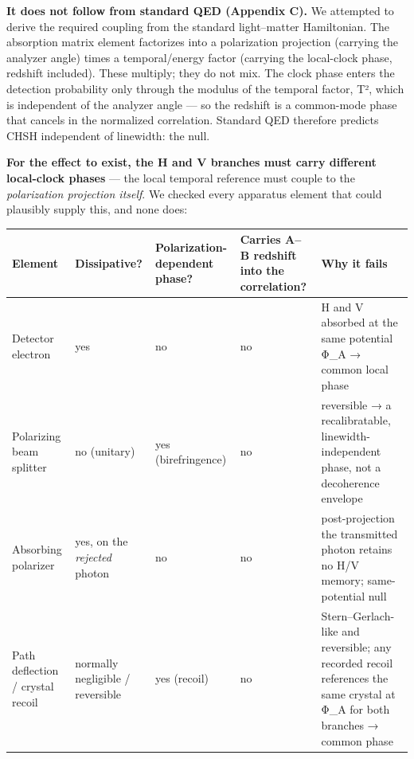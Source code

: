 \documentclass[
]{article}
\newcounter{none} %
\begin{document}
\textbf{It does not follow from standard QED (Appendix C).} We attempted
to derive the required coupling from the standard light--matter
Hamiltonian. The absorption matrix element factorizes into a
polarization projection (carrying the analyzer angle) times a
temporal/energy factor (carrying the local-clock phase, redshift
included). These multiply; they do not mix. The clock phase enters the
detection probability only through the modulus of the temporal factor,
\textbar T\textbar², which is independent of the analyzer angle --- so
the redshift is a common-mode phase that cancels in the normalized
correlation. Standard QED therefore predicts CHSH independent of
linewidth: the null.

\textbf{For the effect to exist, the H and V branches must carry
different local-clock phases} --- the local temporal reference must
couple to the \emph{polarization projection itself}. We checked every
apparatus element that could plausibly supply this, and none does:

{\def\LTcaptype{none} %
\begin{longtable}[]{@{}
  >{\raggedright\arraybackslash}p{}
  >{\raggedright\arraybackslash}p{}
  >{\raggedright\arraybackslash}p{}
  >{\raggedright\arraybackslash}p{}
  >{\raggedright\arraybackslash}p{}@{}}
\toprule\noalign{}
\begin{minipage}[b]{\linewidth}\raggedright
Element
\end{minipage} & \begin{minipage}[b]{\linewidth}\raggedright
Dissipative?
\end{minipage} & \begin{minipage}[b]{\linewidth}\raggedright
Polarization-dependent phase?
\end{minipage} & \begin{minipage}[b]{\linewidth}\raggedright
Carries A--B redshift into the correlation?
\end{minipage} & \begin{minipage}[b]{\linewidth}\raggedright
Why it fails
\end{minipage} \\
\midrule\noalign{}
\endhead
\bottomrule\noalign{}
\endlastfoot
Detector electron & yes & no & no & H and V absorbed at the same
potential Φ\_A → common local phase \\
Polarizing beam splitter & no (unitary) & yes (birefringence) & no &
reversible → a recalibratable, linewidth-independent phase, not a
decoherence envelope \\
Absorbing polarizer & yes, on the \emph{rejected} photon & no & no &
post-projection the transmitted photon retains no H/V memory;
same-potential null \\
Path deflection / crystal recoil & normally negligible / reversible &
yes (recoil) & no & Stern--Gerlach-like and reversible; any recorded
recoil references the same crystal at Φ\_A for both branches → common
phase \\
\end{longtable}
}
\end{document}
